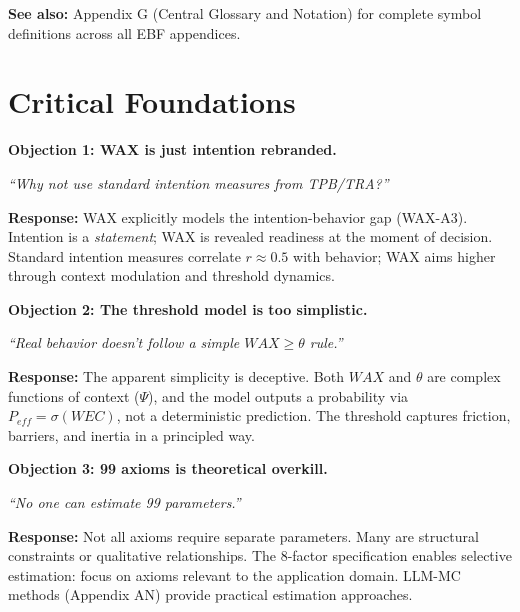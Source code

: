 \textbf{See also:} Appendix G (Central Glossary and Notation) for complete symbol definitions across all EBF appendices.


\section{Critical Foundations}
\label{sec:av-foundations}

\begin{tcolorbox}[colback=red!5!white, colframe=red!75!black,
    title=\textbf{Critical Foundations: Objections and Responses}]

\textbf{Objection 1: WAX is just intention rebranded.}

\textit{``Why not use standard intention measures from TPB/TRA?''}

\textbf{Response:} WAX explicitly models the intention-behavior gap (WAX-A3).
Intention is a \emph{statement}; WAX is revealed readiness at the moment of decision.
Standard intention measures correlate $r \approx 0.5$ with behavior; WAX aims higher
through context modulation and threshold dynamics.

\medskip

\textbf{Objection 2: The threshold model is too simplistic.}

\textit{``Real behavior doesn't follow a simple $WAX \geq \theta$ rule.''}

\textbf{Response:} The apparent simplicity is deceptive. Both $WAX$ and $\theta$ are
complex functions of context ($\Psi$), and the model outputs a probability via
$P_{eff} = \sigma(WEC)$, not a deterministic prediction. The threshold captures
friction, barriers, and inertia in a principled way.

\medskip

\textbf{Objection 3: 99 axioms is theoretical overkill.}

\textit{``No one can estimate 99 parameters.''}

\textbf{Response:} Not all axioms require separate parameters. Many are structural
constraints or qualitative relationships. The 8-factor specification enables
selective estimation: focus on axioms relevant to the application domain.
LLM-MC methods (Appendix AN) provide practical estimation approaches.

\end{tcolorbox}

